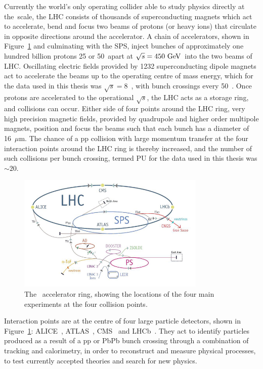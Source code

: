 Currently the world's only operating collider able to study physics directly at the~\TeV scale, the \ac{LHC} consists of thousands of superconducting magnets which act to accelerate, bend and focus two beams of protons (or heavy ions) that circulate in opposite directions around the accelerator. 
A chain of accelerators, shown in Figure~\ref{fig:LHC} and culminating with the \ac{SPS}, inject bunches of approximately one hundred billion protons 25 or 50~\ns apart at $\sqrt{s} = 450~\mathrm{GeV}\,$ into the two beams of \ac{LHC}.
Oscillating electric fields provided by 1232 superconducting dipole magnets act to accelerate the beams up to the operating centre of mass energy, which for the data used in this thesis was $\sqrt{s} = 8$~\TeV, with bunch crossings every 50~\ns.
Once protons are accelerated to the operational $\sqrt{s}$, the \ac{LHC} acts as a storage ring, and collisions can occur.
%
Either side of four points around the \ac{LHC} ring, very high precision magnetic fields, provided by quadrupole and higher order multipole magnets, position and focus the beams such that each bunch has a diameter of 16~$\mu$m. 
The chance of a pp collision with large momentum transfer at the four interaction points around the LHC ring is thereby increased, and the number of such collisions per bunch crossing, termed \ac{PU} for the data used in this thesis was $\sim20$.

\begin{figure}[htbp]
  \begin{center}
  \includegraphics[width=0.8\textwidth]{Figures/detector/lhc}
  \caption{The ~\LHC accelerator ring, showing the locations of the four main experiments at the four collision points.
}
  \label{fig:LHC}
  \end{center}
\end{figure}

Interaction points are at the centre of four large particle detectors, shown in Figure~\ref{fig:LHC}:
\ac{ALICE}~\cite{Aamodt:2008zz}, 
\ac{ATLAS}~\cite{Aad:2008zzm}, 
\ac{CMS}~\cite{Chatrchyan:2008aa} and 
\ac{LHCb}~\cite{Alves:2008zz}.
They act to identify particles produced as a result of a pp or PbPb bunch crossing through a combination of tracking and calorimetry, in order to reconstruct and measure physical processes, to test currently accepted theories and search for new physics.

